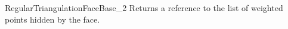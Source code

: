 \begin{ccRefConcept}{RegularTriangulationFaceBase_2}
{Returns a reference to the list of weighted points
hidden by the face.}


\ccHasModels
{}

\ccSeeAlso
{}

\end{ccRefConcept}


